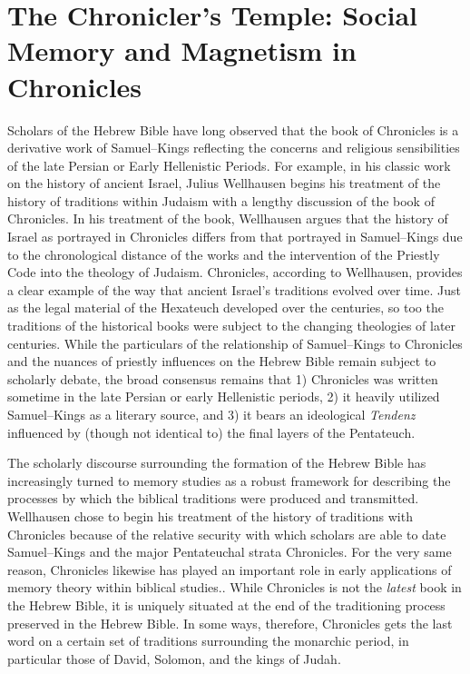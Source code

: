 \hypertarget{the-chroniclers-temple-social-memory-and-magnetism-in-chronicles}{%
\chapter{The Chronicler's Temple: Social Memory and Magnetism in Chronicles}\label{the-chroniclers-temple-social-memory-and-magnetism-in-chronicles}} 

 Scholars of the Hebrew Bible have long observed that the book of Chronicles is a derivative work of Samuel--Kings reflecting the concerns and religious sensibilities of the late Persian or Early Hellenistic Periods. For example, in his classic work on the history of ancient Israel, Julius Wellhausen begins his treatment of the history of traditions within Judaism with a lengthy discussion of the book of Chronicles. In his treatment of the book, Wellhausen argues that the history of Israel as portrayed in Chronicles differs from that portrayed in Samuel--Kings due to the chronological distance of the works and the intervention of the Priestly Code into the theology of \secondtemple Judaism.\autocites[171--172]{wellhausen1957}[See also][]{wright_ulrich-wright1992} Chronicles, according to Wellhausen, provides a clear example of the way that ancient Israel's traditions evolved over time. Just as the legal material of the Hexateuch developed over the centuries, so too the traditions of the historical books were subject to the changing theologies of later centuries. While the particulars of the relationship of Samuel--Kings to Chronicles and the nuances of priestly influences on the Hebrew Bible remain subject to scholarly debate, the broad consensus remains that 1) Chronicles was written sometime in the late Persian or early Hellenistic periods, 2) it heavily utilized Samuel--Kings as a literary source, and 3) it bears an ideological \emph{Tendenz} influenced by (though not identical to) the final layers of the Pentateuch.\autocites[For a thorough and reasonably recent summary of the \emph{status questionis}, see][72--89]{knoppers2003}[See also][]{japhet1993}{japhet2009}{braun1986}[and][]{coggins1976} 

 The scholarly discourse surrounding the formation of the Hebrew Bible has increasingly turned to memory studies as a robust framework for describing the processes by which the biblical traditions were produced and transmitted.\autocites{wright2014}{blenkinsopp2013}{rogerson2010}{davies2008}{hendel2005}{smith_cbq2002} Wellhausen chose to begin his treatment of the history of traditions with Chronicles because of the relative security with which scholars are able to date Samuel--Kings and the major Pentateuchal strata \visavis Chronicles. For the very same reason, Chronicles likewise has played an important role in early applications of memory theory within biblical studies.\autocites{benzvi_st2017}{benzvi-a_evans-williams2013}{benzvi-b_evans-williams2013}. While Chronicles is not the \emph{latest} book in the Hebrew Bible, it is uniquely situated at the end of the traditioning process preserved in the Hebrew Bible. In some ways, therefore, Chronicles gets the last word on a certain set of traditions surrounding the monarchic period, in particular those of David, Solomon, and the kings of Judah. 

